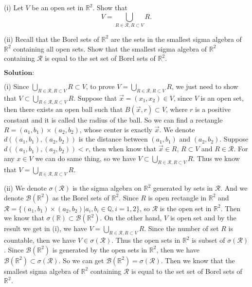 \documentclass[12pt]{article}
\begin{document}
(i) Let $V$ be an open set in $\mathbb{R}^{2}$. Show that 
\begin{equation*}
   V = \bigcup_{R \in \mathcal{R}, R \subset V} R.
\end{equation*}

(ii) Recall that the Borel sets of $\mathbb{R}^{2}$ are the sets in the smallest sigma algebra of $\mathbb{R}^{2}$ containing all open sets. Show that the smallest sigma algebra of $\mathbb{R}^{2}$ containing $\mathcal{R}$ is equal to the set set of Borel sets of $\mathbb{R}^{2}$. 

\vspace{8pt}
$\textbf{Solution:}$

(i) Since $\bigcup_{R \in \mathcal{R}, R \subset V} R \subset V$, to prove $V = \bigcup_{R \in \mathcal{R}, R \subset V} R$, we just need to show that $V \subset \bigcup_{R \in \mathcal{R}, R \subset V} R$. Suppose that $\vec{x} = (x_{1}, x_{2}) \in V$, since $V$ is an open set, then there exists an open ball such that $B(\vec{x}, r) \subset V$, where $r$ is a positive constant and it is called the radius of the ball. So we can find a rectangle $ R = (a_{1}, b_{1}) \times (a_{2}, b_{2})$, whose center is exactly $\vec{x}$. We denote $d((a_{1}, b_{1}), (a_{2}, b_{2}))$ is the distance between $(a_{1}, b_{1})$ and $(a_{2}, b_{2})$. Suppose $d((a_{1}, b_{1}), (a_{2}, b_{2})) < r$, then when know that $\vec{x} \in R$, $R \subset V$ and $R \in \mathcal{R}$. For any $x \in V$ we can do same thing, so we have $V \subset \bigcup_{R \in \mathcal{R}, R \subset V} R$. Thus we know that $V = \bigcup_{R \in \mathcal{R}, R \subset V} R$.

(ii) We denote $\sigma(\mathcal{R})$ is the sigma algebra on $\mathbb{R}^{2}$ generated by sets in $\mathcal{R}$. And we denote $\mathcal{B}(\mathbb{R}^{2})$ as the Borel sets of $\mathbb{R}^{2}$. Since $R$ is open rectangle in $\mathbb{R}^{2}$ and $\mathcal{R} = \{(a_{1}, b_{1}) \times (a_{2}, b_{2}) | a_{i}, b_{i} \in \mathbb{Q}, i = 1, 2\}$, so $\mathcal{R}$ is the open set in $\mathbb{R}^{2}$. Then we know that $\sigma(\mathbb{R}) \subset \mathcal{B}(\mathbb{R}^{2})$. On the other hand, $V$ is open set and by the result we get in (i), we have $V = \bigcup_{R \in \mathcal{R}, R \subset V} R$. Since the number of set $R$ is countable, then we have $V \in \sigma(\mathcal{R})$. Thus the open sets in $\mathbb{R}^{2}$ is subset of $\sigma(\mathcal{R})$. Since $\mathcal{B}(\mathbb{R}^{2})$ is generated by the open sets in $\mathbb{R}^{2}$, then we have $\mathcal{B}(\mathbb{R}^{2}) \subset \sigma(\mathcal{R})$. So we can get $\mathcal{B}(\mathbb{R}^{2}) = \sigma(\mathcal{R})$. Then we know that the smallest sigma algebra of $\mathbb{R}^{2}$ containing $\mathcal{R}$ is equal to the set set of Borel sets of $\mathbb{R}^{2}$.
\end{document}
